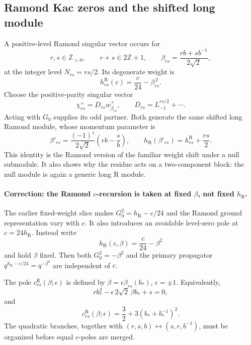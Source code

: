 \documentclass[11pt]{article}
\newcommand{\R}{\mathrm{R}}
\begin{document}
\subsection{Ramond Kac zeros and the shifted long module}
\label{sec:r-kac}

A positive-level Ramond singular vector occurs for
\begin{equation}
 r,s\in\mathbb Z_{>0},\qquad r+s\in2\mathbb Z+1,
 \qquad
 \beta_{rs}=\frac{rb+sb^{-1}}{2\sqrt2},
 \label{eq:r-beta-rs}
\end{equation}
at the integer level $N_{rs}=rs/2$.  Its degenerate weight is
\begin{equation}
 h^{\R}_{rs}(c)=\frac{c}{24}-\beta_{rs}^{\,2}.
 \label{eq:r-degenerate-weight}
\end{equation}
Choose the positive-parity singular vector
\begin{equation}
 \chi^+_{rs}=D_{rs}w^+_{\beta_{rs}},
 \qquad D_{rs}=L_{-1}^{rs/2}+\cdots .
 \label{eq:r-null-vector}
\end{equation}
Acting with $G_0$ supplies its odd partner.  Both generate the same shifted
long Ramond module, whose momentum parameter is
\begin{equation}
 \beta'_{rs}=\frac{(-1)^s}{2\sqrt2}
 \left(rb-\frac{s}{b}\right),
 \qquad
 h_{\R}(\beta'_{rs})=h^{\R}_{rs}+\frac{rs}{2}.
 \label{eq:r-shifted-beta}
\end{equation}
This identity is the Ramond version of the familiar weight shift under a
null submodule.  It also shows why the residue acts on a two-component block:
the null module is again a generic long R module.

\paragraph{Correction: the Ramond \(c\)-recursion is taken at fixed
\(\beta\), not fixed \(h_{\R}\).}
The earlier fixed-weight slice makes
\(G_0^2=h_{\R}-c/24\) and the Ramond ground representation vary with \(c\).
It also introduces an avoidable level-zero pole at \(c=24h_{\R}\).
Instead write
\begin{equation}
 h_{\R}(c,\beta)=\frac{c}{24}-\beta^2
\end{equation}
and hold \(\beta\) fixed.  Then both \(G_0^2=-\beta^2\) and the primary
propagator \(q^{h_{\R}-c/24}=q^{-\beta^2}\) are independent of \(c\).

The pole \(c^{\R}_{rs}(\beta;\epsilon)\) is defined by
\(\beta=\epsilon\beta_{rs}(b_*)\), \(\epsilon=\pm1\).  Equivalently,
\begin{equation}
 r b_*^2-\epsilon\,2\sqrt2\,\beta b_*+s=0,
 \label{eq:r-b-quadratic}
\end{equation}
and
\begin{equation}
 c^{\R}_{rs}(\beta;\epsilon)
 =\frac32+3\left(b_*+b_*^{-1}\right)^2 .
 \label{eq:r-c-pole}
\end{equation}
The quadratic branches, together with
\((r,s,b)\leftrightarrow(s,r,b^{-1})\), must be organized before equal
\(c\)-poles are merged.
\end{document}
